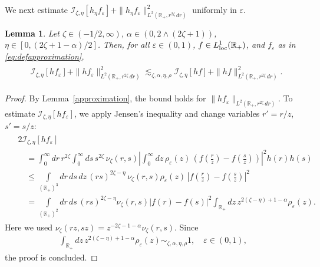\documentclass[12pt,reqno]{amsart}
\newtheorem{lemma}[theorem]{Lemma}
\theoremstyle{definition}
\theoremstyle{remark}
\numberwithin{equation}{section}
\newcommand{\1}{\mathbbm{1}}
\renewcommand{\epsilon}{\varepsilon}
\newcommand{\loc}{{\rm loc}}
\newcommand{\R}{\mathbb{R}}
\def\ci{\mathcal{I}}
\begin{document}
We next estimate $\ci_{\zeta,\eta}[h_{\eta}f_\epsilon]+ \|h_{\eta} f_\epsilon\|_{L^2(\R_+,r^{2\zeta}\,dr)}^2$ uniformly in $\epsilon$.

\begin{lemma}
  \label{boglem52}
  Let $\zeta\in(-1/2,\infty)$, $\alpha\in(0,2\wedge(2\zeta+1))$, $\eta\in[0,(2\zeta+1-\alpha)/2]$. Then, for all $\epsilon\in(0,1)$, $f\in L_\loc^1(\R_+)$, and $f_\epsilon$ as in \eqref{eq:defapproximation},
  \begin{align}
    \label{eq:boglem52}
    \begin{split}
      & \ci_{\zeta,\eta}[h f_\epsilon] + \|h f_\epsilon\|_{L^2(\R_+,r^{2\zeta}\,dr)}^2
      \lesssim_{\zeta,\alpha,\eta,\rho} \ci_{\zeta,\eta}[h f] + \|h f\|_{L^2(\R_+,r^{2\zeta}\,dr)}^2.
    \end{split}
  \end{align}
\end{lemma}

\begin{proof}
  By Lemma~\ref{approximation}, the bound holds for $\|h f_\epsilon\|_{L^2(\R_+,r^{2\zeta}\,dr)}$. To estimate $\ci_{\zeta,\eta}[h f_\epsilon]$, we apply Jensen's inequality and change variables $r' = r/z$, $s'=s/z$:
  \begin{align}
    \begin{split}
      & 2\ci_{\zeta,\eta}[h f_\epsilon] \\
      & \quad = \int_0^\infty dr\, r^{2\zeta}\int_0^\infty ds\, s^{2\zeta}\, \nu_{\zeta}(r,s) \left|\int_0^\infty dz\, \rho_\epsilon(z)\, (f(\tfrac rz)-f(\tfrac sz))\right|^2 h(r) h(s) \\
      & \quad \leq \int\limits_{(\R_+)^3}dr\,ds\,dz\, (rs)^{2\zeta-\eta}\, \nu_\zeta(r,s)\rho_\epsilon(z)\, |f(\tfrac rz)-f(\tfrac sz)|^2 \\
      & \quad = \int\limits_{(\R_+)^2}dr\,ds\, (rs)^{2\zeta-\eta} \nu_\zeta(r,s) |f(r)-f(s)|^2 \int_{\R_+}dz\, z^{2(\zeta-\eta)+1-\alpha} \rho_\epsilon(z).
    \end{split}
  \end{align}
  Here we used $\nu_\zeta(rz,sz)=z^{-2\zeta-1-\alpha}\nu_\zeta(r,s)$. Since
  \begin{align}
    \label{eq:boglem52aux}
    \int_{\R_+}dz\, z^{2(\zeta-\eta)+1-\alpha} \rho_\epsilon(z)
    \sim_{\zeta,\alpha,\eta,\rho} 1,
    \quad \epsilon\in(0,1),
  \end{align}
  the proof is concluded.
\end{proof}
\end{document}

